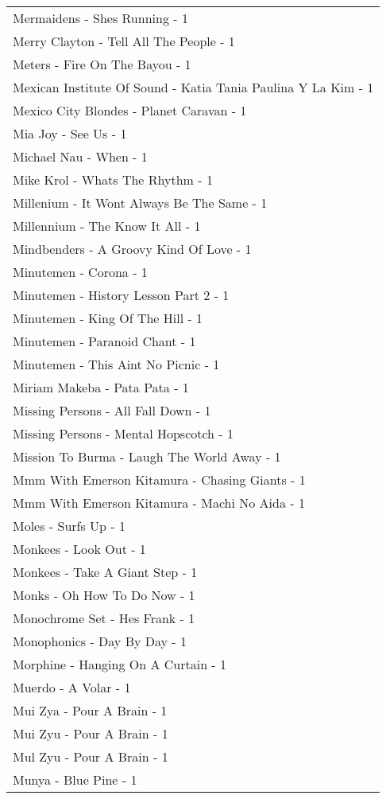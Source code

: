 \documentclass[
]{article}
\begin{document}
\begin{longtable}{l}
Mermaidens - Shes Running - 1 \\ 
Merry Clayton - Tell All The People - 1 \\ 
Meters - Fire On The Bayou - 1 \\ 
Mexican Institute Of Sound - Katia Tania Paulina Y La Kim - 1 \\ 
Mexico City Blondes - Planet Caravan - 1 \\ 
Mia Joy - See Us - 1 \\ 
Michael Nau - When - 1 \\ 
Mike Krol - Whats The Rhythm - 1 \\ 
Millenium - It Wont Always Be The Same - 1 \\ 
Millennium - The Know It All - 1 \\ 
Mindbenders - A Groovy Kind Of Love - 1 \\ 
Minutemen - Corona - 1 \\ 
Minutemen - History Lesson Part 2 - 1 \\ 
Minutemen - King Of The Hill - 1 \\ 
Minutemen - Paranoid Chant - 1 \\ 
Minutemen - This Aint No Picnic - 1 \\ 
Miriam Makeba - Pata Pata - 1 \\ 
Missing Persons - All Fall Down - 1 \\ 
Missing Persons - Mental Hopscotch - 1 \\ 
Mission To Burma - Laugh The World Away - 1 \\ 
Mmm With Emerson Kitamura - Chasing Giants - 1 \\ 
Mmm With Emerson Kitamura - Machi No Aida - 1 \\ 
Moles - Surfs Up - 1 \\ 
Monkees - Look Out - 1 \\ 
Monkees - Take A Giant Step - 1 \\ 
Monks - Oh How To Do Now - 1 \\ 
Monochrome Set - Hes Frank - 1 \\ 
Monophonics - Day By Day - 1 \\ 
Morphine - Hanging On A Curtain - 1 \\ 
Muerdo - A Volar - 1 \\ 
Mui Zya - Pour A Brain - 1 \\ 
Mui Zyu - Pour A Brain - 1 \\ 
Mul Zyu - Pour A Brain - 1 \\ 
Munya - Blue Pine - 1 \\ 

\end{longtable}
\end{document}
